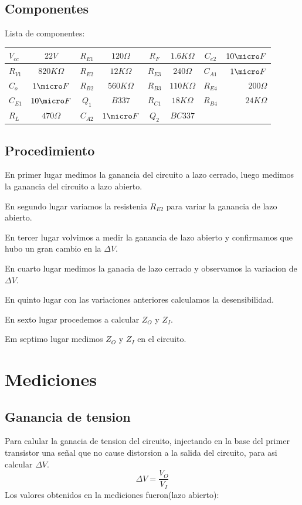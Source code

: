 \documentclass[12pt]{article}
\begin{document}
\subsection{Componentes}
Lista de componentes:

\begin{tabular}{| l | c || c | c || c | c || c | r | }
 \hline                 
$V_{cc}$ & $22V$ & $R_{E1}$ & $120 \Omega$ & $R_F$ & $1.6 K \Omega$ & $ C_{e2} $ & $ 10\micro F $ \\
 \hline                 
$R_{V1}$ & $820K\Omega$ & $R_{E2}$ & $12K \Omega$ & $R_{E3}$ & $240 \Omega$ & $ C_{A1} $ & $ 1\micro F $ \\
 \hline                 
$C_{o}$ & $1\micro F$ & $R_{B2}$ & $560K \Omega$ & $R_{B3}$ & $110 K \Omega$ & $ R_{E4} $ & $ 200\Omega $ \\
 \hline                 
$C_{E1}$ & $10\micro F$ & $Q_{1}$ & $B337$ & $R_{C1}$ & $18 K \Omega$ & $ R_{B4} $ & $ 24K \Omega $ \\
 \hline                
$R_{L}$ & $470\Omega$ & $C_{A2}$ & $1\micro F$ & $Q_{2}$ & $BC337$ &  &  \\
 \hline  
 \end{tabular}
 
\subsection{Procedimiento}
En primer lugar medimos la ganancia del circuito a lazo cerrado, luego medimos la ganancia del circuito a lazo abierto.

En segundo lugar variamos la resistenia $R_{E2}$ para variar la ganancia de lazo abierto.

En tercer lugar volvimos a medir la ganancia de lazo abierto y confirmamos que hubo un gran cambio en la $\Delta V$.

En cuarto lugar medimos la ganacia de lazo cerrado y observamos la variacion de  $\Delta V$.

En quinto lugar con las variaciones anteriores calculamos la desensibilidad.

En sexto lugar procedemos a calcular $Z_O$ y $Z_I$.

Em septimo lugar medimos $Z_O$ y $Z_I$ en el circuito.
\section{Mediciones}
\subsection{Ganancia de tension }
Para calular la ganacia de tension del circuito, injectando en la base del primer transistor una señal que no cause
distorsion a la salida del circuito, para asi calcular $\Delta V$.
\begin{equation}
\Delta V = \frac{V_O}{V_I} 
\end{equation}
Los valores obtenidos en la mediciones fueron(lazo abierto):
\end{document}
